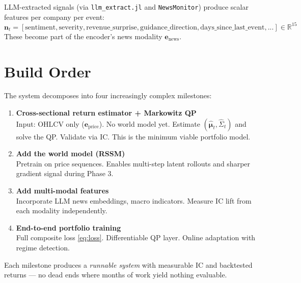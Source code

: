 \documentclass[11pt, a4paper]{article}
\begin{document}
LLM-extracted signals (via \texttt{llm\_extract.jl} and \texttt{NewsMonitor})
produce scalar features per company per event:
\[
  \mathbf{n}_t = \left[\text{sentiment}, \text{severity},
                       \text{revenue\_surprise}, \text{guidance\_direction},
                       \text{days\_since\_last\_event}, ...\right] \in \mathbb{R}^{15}
\]
These become part of the encoder's news modality $\mathbf{e}_\text{news}$.

\section{Build Order}

The system decomposes into four increasingly complex milestones:

\begin{enumerate}
  \item \textbf{Cross-sectional return estimator + Markowitz QP} \\
    Input: OHLCV only ($\mathbf{e}_\text{price}$).  No world model yet.
    Estimate $(\hat{\boldsymbol{\mu}}_t, \hat{\Sigma}_t)$ and solve the QP.
    Validate via IC. This is the minimum viable portfolio model.

  \item \textbf{Add the world model (RSSM)} \\
    Pretrain on price sequences.  Enables multi-step latent rollouts
    and sharper gradient signal during Phase 3.

  \item \textbf{Add multi-modal features} \\
    Incorporate LLM news embeddings, macro indicators.
    Measure IC lift from each modality independently.

  \item \textbf{End-to-end portfolio training} \\
    Full composite loss \eqref{eq:loss}.  Differentiable QP layer.
    Online adaptation with regime detection.
\end{enumerate}

Each milestone produces a \emph{runnable system} with measurable IC and
backtested returns — no dead ends where months of work yield nothing evaluable.

\end{document}
